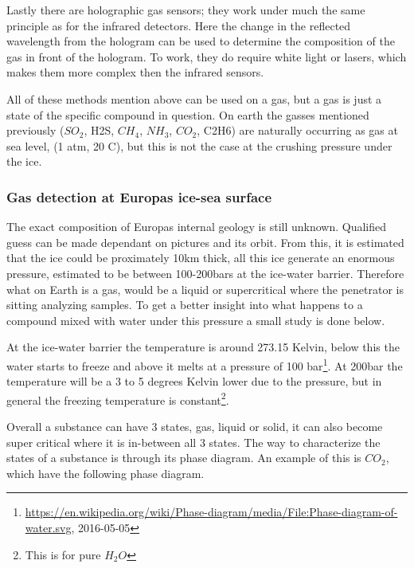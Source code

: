 Lastly there are holographic gas sensors; they work under much the same principle as for the infrared detectors. Here the change in the reflected wavelength from the hologram can be used to determine the composition of the gas in front of the hologram. To work, they do require white light or lasers, which makes them more complex then the infrared sensors.

All of these methods mention above can be used on a gas, but a gas is just a state of the specific compound in question. On earth the gasses mentioned previously ($SO_2$, H2S, $CH_4$, $NH_3$, $CO_2$, C2H6) are naturally occurring as gas at sea level, (1 atm, 20 C), but this is not the case at the crushing pressure under the ice.

\subsubsection{Gas detection at Europas ice-sea surface}

The exact composition of Europas internal geology is still unknown. Qualified guess can be made dependant on pictures and its orbit. From this, it is estimated that the ice could be proximately 10km thick, all this ice generate an enormous pressure, estimated to be between 100-200bars at the ice-water barrier. Therefore what on Earth is a gas, would be a liquid or supercritical where the penetrator is sitting analyzing samples. To get a better insight into what happens to a compound mixed with water under this pressure a small study is done below.

At the ice-water barrier the temperature is around 273.15 Kelvin, below this the water starts to freeze and above it melts at a pressure of 100 bar\footnote{\url{https://en.wikipedia.org/wiki/Phase-diagram/media/File:Phase-diagram-of-water.svg}, 2016-05-05}. At 200bar the temperature will be a 3 to 5 degrees Kelvin lower due to the pressure, but in general the freezing temperature is constant\footnote{This is for pure $H_2 O$}.

Overall a substance can have 3 states, gas, liquid or solid, it can also become super critical where it is in-between all 3 states. The way to characterize the states of a substance is through its phase diagram. An example of this is $CO_2$, which have the following phase diagram.


